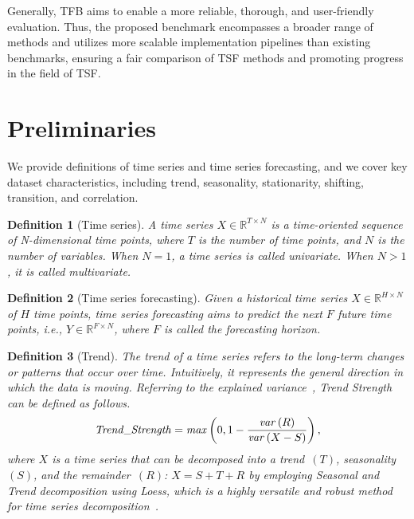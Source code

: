 \documentclass[sigconf, nonacm, pdfa]{acmart}
\newtheorem{definition}{Definition}
\begin{document}
Generally, TFB aims to enable a more reliable, thorough, and user-friendly evaluation. Thus, the proposed benchmark encompasses a broader range of methods and utilizes more scalable implementation pipelines than existing benchmarks, ensuring a fair comparison of TSF methods and promoting progress in the field of TSF.

\section{Preliminaries}
\label{sec:Preliminaries}
We provide definitions of time series and time series forecasting, and we cover key dataset characteristics, including trend, seasonality, stationarity, shifting, transition, and correlation. 


\begin{definition}[Time series]
A time series  $X \in \mathbb{R}^{T\times N}$ is a time-oriented sequence of N-dimensional time points,  where $T$ is the number of time points, and $N$ is the number of variables. When $N=1$, a time series is called univariate. When $N>1$, it is called multivariate.     
\end{definition}

\begin{definition}[Time series forecasting]
Given a historical time series $X\in\mathbb{R}^{H\times N}$ of $H$ time points, time series forecasting aims to predict the next $F$ future time points, i.e., $Y\in\mathbb{R}^{F\times N}$, where $F$ is called the forecasting horizon.   
\end{definition} 


\begin{definition}[Trend]
The trend of a time series refers to the long-term changes or patterns that occur over time. Intuitively, it represents the general direction in which the data is moving. Referring to the explained variance~\cite{o1982measures}, Trend Strength can be defined as follows.
\begin{equation}
\footnotesize
\mathit{Trend\_Strength} = \mathit{max} \left(0, 1 - \frac{\mathit{var}\left(R\right)}{\mathit{var}\left(X - S\right)}\right),
\end{equation}
where $X$ is a time series that can be decomposed into a trend~$(T)$, seasonality~$(S)$, and the remainder~$(R)$: $X=S+T+R$ by employing Seasonal and Trend decomposition using Loess, which is a highly versatile and robust method for time series decomposition~\cite{cleveland1990stl}.
\end{definition} 
\end{document}
